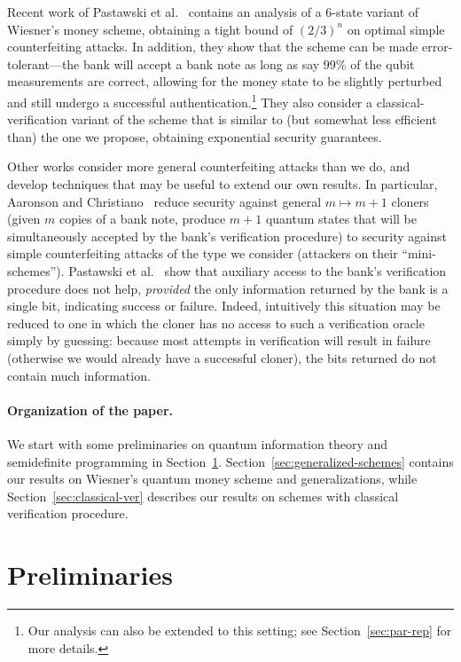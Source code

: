 \documentclass[11pt,letterpaper]{article}
\theoremstyle{definition}
\begin{document}
Recent work of Pastawski et al.~\cite{PYJLC11} contains an
analysis of a $6$-state variant of Wiesner's money scheme, obtaining a
tight bound of $(2/3)^n$ on optimal simple counterfeiting attacks.
In addition, they show that the scheme can be made
error-tolerant---the bank will accept a bank note as long as say
$99\%$ of the qubit measurements are correct, allowing for the money
state to be slightly perturbed and still undergo a successful
authentication.\footnote{Our analysis can also be extended to this setting;
see Section~\ref{sec:par-rep} for more details.}
They also consider a classical-verification variant of the scheme
that is similar to (but somewhat less efficient than) the one we
propose, obtaining exponential security guarantees.

Other works consider more general counterfeiting attacks than we do,
and develop techniques that may be useful to extend our own results.  
In particular, Aaronson and Christiano~\cite{AC12} reduce security
against general $m\mapsto m+1$ cloners (given $m$ copies of a bank note,
produce $m+1$ quantum states that will be simultaneously accepted by the bank's 
verification procedure) to security against simple counterfeiting attacks of
the type we consider (attackers on their ``mini-schemes''). 
Pastawski et al.~\cite{PYJLC11} show that 
auxiliary access to the bank's verification procedure does not help,
\emph{provided} the only information returned by the bank is a single
bit, indicating success or failure. 
Indeed, intuitively this situation may be reduced to one in which the
cloner has no access to such a verification oracle simply by guessing:
because most attempts in verification will result in failure (otherwise
we would already have a successful cloner), the bits returned do not
contain much information.

\paragraph{Organization of the paper.}
We start with some preliminaries on quantum information theory and
semidefinite programming in Section~\ref{sec:preliminaries}.
Section~\ref{sec:generalized-schemes} contains our results on
Wiesner's quantum money scheme and generalizations, while
Section~\ref{sec:classical-ver} describes our results on schemes with
classical verification procedure.

\section{Preliminaries}
\label{sec:preliminaries}
\end{document}
